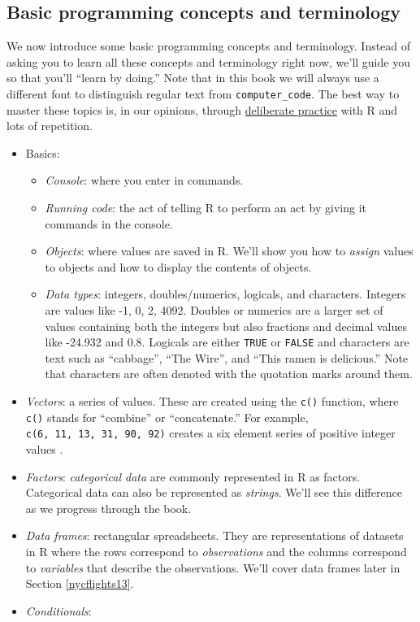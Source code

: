 \documentclass[]{book}
\providecommand{\tightlist}{%
  \setlength{\itemsep}{0pt}\setlength{\parskip}{0pt}}
\begin{document}
\hypertarget{programming-concepts}{%
\subsection{Basic programming concepts and terminology}\label{programming-concepts}}

We now introduce some basic programming concepts and terminology. Instead of asking you to learn all these concepts and terminology right now, we'll guide you so that you'll ``learn by doing.'' Note that in this book we will always use a different font to distinguish regular text from \texttt{computer\_code}. The best way to master these topics is, in our opinions, through \href{https://jamesclear.com/deliberate-practice-theory}{deliberate practice} with R and lots of repetition.

\begin{itemize}
\tightlist
\item
  Basics: 

  \begin{itemize}
  \tightlist
  \item
    \emph{Console}: where you enter in commands. 
  \item
    \emph{Running code}: the act of telling R to perform an act by giving it commands in the console.
  \item
    \emph{Objects}: where values are saved in R. We'll show you how to \emph{assign} values to objects and how to display the contents of objects. 
  \item
    \emph{Data types}: integers, doubles/numerics, logicals, and characters.  Integers are values like -1, 0, 2, 4092. Doubles or numerics are a larger set of values containing both the integers but also fractions and decimal values like -24.932 and 0.8. Logicals are either \texttt{TRUE} or \texttt{FALSE} and characters are text such as ``cabbage'', ``The Wire'', and ``This ramen is delicious.'' Note that characters are often denoted with the quotation marks around them.
  \end{itemize}
\item
  \emph{Vectors}: a series of values. These are created using the \texttt{c()} function, where \texttt{c()} stands for ``combine'' or ``concatenate.'' For example, \texttt{c(6,\ 11,\ 13,\ 31,\ 90,\ 92)} creates a six element series of positive integer values .
\item
  \emph{Factors}: \emph{categorical data} are commonly represented in R as factors.  Categorical data can also be represented as \emph{strings}. We'll see this difference as we progress through the book.
\item
  \emph{Data frames}: rectangular spreadsheets. They are representations of datasets in R where the rows correspond to \emph{observations} and the columns correspond to \emph{variables} that describe the observations.  We'll cover data frames later in Section \ref{nycflights13}.
\item
  \emph{Conditionals}: 


\end{itemize}
\end{document}
